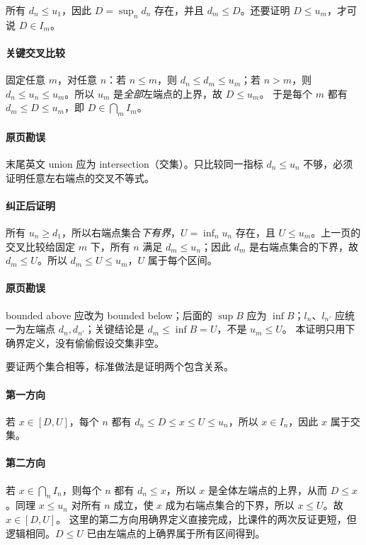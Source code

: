 所有 $d_n\le u_1$，因此 $D=\sup_n d_n$ 存在，并且 $d_m\le D$。还要证明 $D\le u_m$，才可说 $D\in I_m$。
\paragraph{关键交叉比较}固定任意 $m$，对任意 $n$：若 $n\le m$，则 $d_n\le d_m\le u_m$；若 $n>m$，则 $d_n\le u_n\le u_m$。所以 $u_m$ 是\emph{全部}左端点的上界，故 $D\le u_m$。
于是每个 $m$ 都有 $d_m\le D\le u_m$，即 $D\in\bigcap_m I_m$。
\paragraph{原页勘误}末尾英文 union 应为 intersection（交集）。只比较同一指标 $d_n\le u_n$ 不够，必须证明任意左右端点的交叉不等式。

\paragraph{纠正后证明}所有 $u_n\ge d_1$，所以右端点集合\emph{下有界}，$U=\inf_n u_n$ 存在，且 $U\le u_m$。上一页的交叉比较给固定 $m$ 下，所有 $n$ 满足 $d_m\le u_n$；因此 $d_m$ 是右端点集合的下界，故 $d_m\le U$。所以 $d_m\le U\le u_m$，$U$ 属于每个区间。
\paragraph{原页勘误}bounded above 应改为 bounded below；后面的 $\sup B$ 应为 $\inf B$；$l_n$、$l_{n'}$ 应统一为左端点 $d_n,d_{n'}$；关键结论是 $d_m\le\inf B=U$，不是 $u_m\le U$。
本证明只用下确界定义，没有偷偷假设交集非空。

要证两个集合相等，标准做法是证明两个包含关系。
\paragraph{第一方向}若 $x\in[D,U]$，每个 $n$ 都有 $d_n\le D\le x\le U\le u_n$，所以 $x\in I_n$，因此 $x$ 属于交集。
\paragraph{第二方向}若 $x\in\bigcap_n I_n$，则每个 $n$ 都有 $d_n\le x$，所以 $x$ 是全体左端点的上界，从而 $D\le x$。同理 $x\le u_n$ 对所有 $n$ 成立，使 $x$ 成为右端点集合的下界，所以 $x\le U$。故 $x\in[D,U]$。
这里的第二方向用确界定义直接完成，比课件的两次反证更短，但逻辑相同。$D\le U$ 已由左端点的上确界属于所有区间得到。

